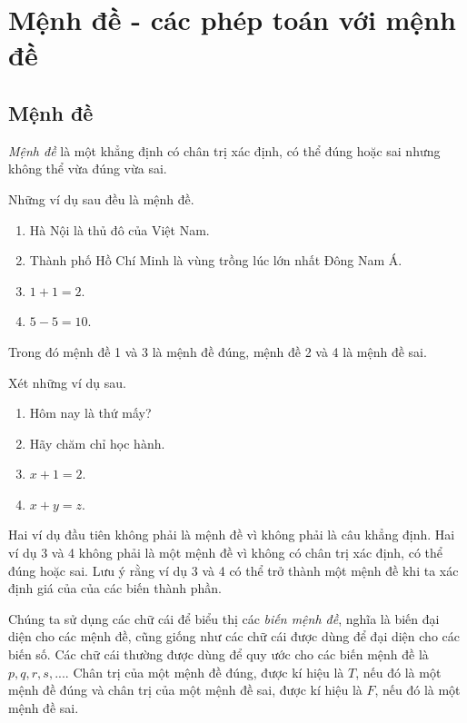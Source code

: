 \documentclass{standalone} %
\begin{document}
    \section{Mệnh đề - các phép toán với mệnh đề}
    \subsection{Mệnh đề}
    \begin{theorem} 
        \emph{Mệnh đề} là một khẳng định có chân trị xác định, có thể đúng hoặc sai nhưng không thể vừa đúng vừa sai.
    \end{theorem}
        \begin{example}
            Những ví dụ sau đều là mệnh đề.
            \begin{enumerate}
                \item Hà Nội là thủ đô của Việt Nam.
                \item Thành phố Hồ Chí Minh là vùng trồng lúc lớn nhất Đông Nam Á.
                \item $1 + 1 = 2$.
                \item $5 - 5 = 10$.
            \end{enumerate}
        \end{example}
        Trong đó mệnh đề 1 và 3 là mệnh đề đúng, mệnh đề 2 và 4 là mệnh đề sai.\\
        \begin{example}
            Xét những ví dụ sau.
            \begin{enumerate}
                \item Hôm nay là thứ mấy?
                \item Hãy chăm chỉ học hành.
                \item $x + 1 = 2$.
                \item $x + y = z$.
            \end{enumerate}
        \end{example}

        Hai ví dụ đầu tiên không phải là mệnh đề vì không phải là câu khẳng định. Hai ví dụ 3 và 4 không phải là một mệnh đề vì không có chân trị xác
        định, có thể đúng hoặc sai. Lưu ý rằng ví dụ 3 và 4 có thể trở thành một mệnh đề khi ta xác định giá của của các biến thành phần.

        Chúng ta sử dụng các chữ cái để biểu thị các \emph{biến mệnh đề}, nghĩa là biến đại diện cho các mệnh đề, cũng giống như các chữ cái được dùng
        để đại diện cho các biến số. Các chữ cái thường được dùng để quy ước cho các biến mệnh đề là $p, q, r, s, ...$. Chân trị của một mệnh đề đúng, được kí hiệu là
        $T$, nếu đó là một mệnh đề đúng và chân trị của một mệnh đề sai, được kí hiệu là $F$, nếu đó là một mệnh đề sai.
\end{document}
